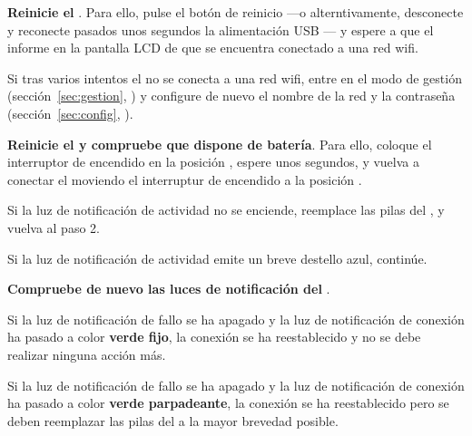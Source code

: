 \begin{enumeratecompact}

\item \textbf{Reinicie el \MIE}. Para ello, pulse el botón de reinicio  ---o alterntivamente, desconecte y reconecte pasados unos segundos la alimentación USB --- y espere a que el \MI informe en la pantalla LCD  de que se encuentra conectado a una red wifi.

\begin{itemizecompact}

\item Si tras varios intentos el \MI no se conecta a una red wifi, entre en el modo de gestión (sección~\ref{sec:gestion}, ) y configure de nuevo el nombre de la red y la contraseña (sección~\ref{sec:config}, ).

\end{itemizecompact}

\item \textbf{Reinicie el \MEE y compruebe que dispone de batería}. Para ello, coloque el interruptor de encendido  en la posición \off, espere unos segundos, y vuelva a conectar el \ME moviendo el interruptur de encendido  a la posición \on. 

\begin{itemizecompact}

\item Si la luz de notificación de actividad  no se enciende, reemplace las pilas del \ME, y vuelva al paso 2.

\item Si la luz de notificación de actividad  emite un breve destello azul, continúe. 

\end{itemizecompact}


\item \textbf{Compruebe de nuevo las luces de notificación del \MIE}.

\begin{itemizecompact}

\item Si la luz de notificación de fallo  se ha apagado y la luz de notificación de conexión  ha pasado a color \textbf{verde fijo}, la conexión se ha reestablecido y no se debe realizar ninguna acción más.

\item Si la luz de notificación de fallo  se ha apagado y la luz de notificación de conexión  ha pasado a color \textbf{verde parpadeante}, la conexión se ha reestablecido pero se deben reemplazar las pilas del \ME a la mayor brevedad posible.


\end{itemizecompact}
\end{enumeratecompact}
